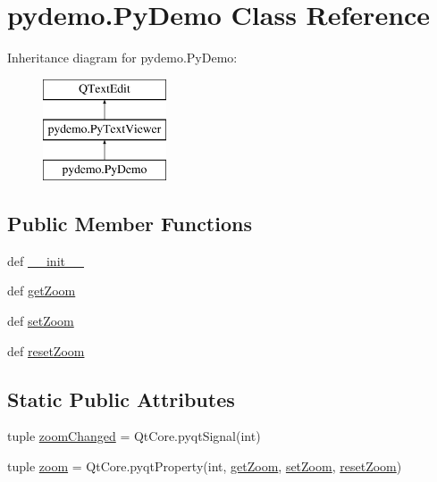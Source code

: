 \hypertarget{classpydemo_1_1PyDemo}{}\section{pydemo.\+Py\+Demo Class Reference}
\label{classpydemo_1_1PyDemo}
Inheritance diagram for pydemo.\+Py\+Demo\+:\begin{figure}[H]
\begin{center}
\leavevmode
\includegraphics[height=3.000000cm]{classpydemo_1_1PyDemo}
\end{center}
\end{figure}
\subsection*{Public Member Functions}
\begin{DoxyCompactItemize}
\item 
def \hyperlink{classpydemo_1_1PyDemo_a1ee51863a53d7f38bebb570b45ea1f1d}{\+\_\+\+\_\+init\+\_\+\+\_\+}
\item 
def \hyperlink{classpydemo_1_1PyDemo_ad5372dbefaa81cb7ad6fd85560ccba85}{get\+Zoom}
\item 
def \hyperlink{classpydemo_1_1PyDemo_aa604b52bbced1ffb7d5a9d73d51f9215}{set\+Zoom}
\item 
def \hyperlink{classpydemo_1_1PyDemo_a37e84a3d0ca6c8a80560ff968a45af25}{reset\+Zoom}
\end{DoxyCompactItemize}
\subsection*{Static Public Attributes}
\begin{DoxyCompactItemize}
\item 
tuple \hyperlink{classpydemo_1_1PyDemo_a9a0f1b7b8bfa7a0e6a63be908d5b9009}{zoom\+Changed} = Qt\+Core.\+pyqt\+Signal(int)
\item 
tuple \hyperlink{classpydemo_1_1PyDemo_afc15d79b4d58f412a68e2eed76fde7ff}{zoom} = Qt\+Core.\+pyqt\+Property(int, \hyperlink{classpydemo_1_1PyDemo_ad5372dbefaa81cb7ad6fd85560ccba85}{get\+Zoom}, \hyperlink{classpydemo_1_1PyDemo_aa604b52bbced1ffb7d5a9d73d51f9215}{set\+Zoom}, \hyperlink{classpydemo_1_1PyDemo_a37e84a3d0ca6c8a80560ff968a45af25}{reset\+Zoom})
\end{DoxyCompactItemize}



